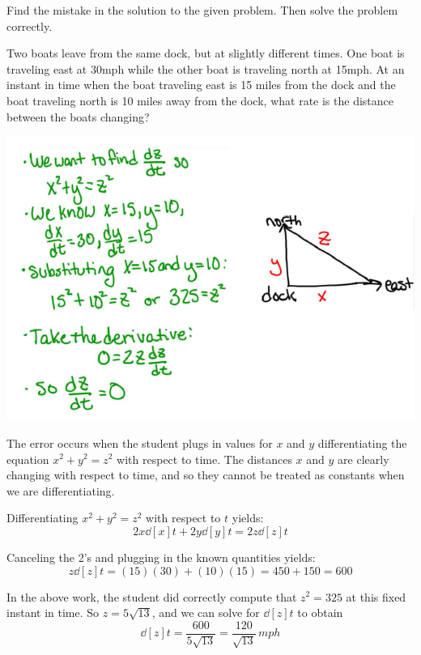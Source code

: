 \documentclass[nooutcomes]{ximera}
\begin{document}
\begin{problem}
Find the mistake in the solution to the given problem.  Then solve the problem correctly.

Two boats leave from the same dock, but at slightly different times.  One boat is traveling east at 30mph while the other boat is traveling north at 15mph.  At an instant in time when the boat traveling east is 15 miles from the dock and the boat traveling north is 10 miles away from the dock, what rate is the distance between the boats changing?
	\begin{image}
	\includegraphics[scale=.7]{Figure1.png}
	\end{image}
	
		\begin{freeResponse} 
		The error occurs when the student plugs in values for $x$ and $y$  differentiating the equation $x^2 + y^2 = z^2$ with respect to time.  The distances $x$ and $y$ are clearly changing with respect to time, and so they cannot be treated as constants when we are differentiating.
		
		Differentiating $x^2 + y^2 = z^2$ with respect to $t$ yields:
		$$ 2x \dd[x]{t} + 2y \dd[y]{t} = 2z \dd[z]{t}$$
		
		Canceling the 2's and plugging in the known quantities yields:
		$$ z \dd[z]{t} = (15)(30) + (10)(15) = 450 + 150 = 600 $$
		
		In the above work, the student did correctly compute that $z^2 = 325$ at this fixed instant in time.  So $z = 5\sqrt{13}$, and we can solve for $\dd[z]{t}$ to obtain
		$$ \dd[z]{t} = \frac{600}{5 \sqrt{13}} = \frac{120}{\sqrt{13}} \, mph $$
		\end{freeResponse}	

\end{problem}
\end{document}
